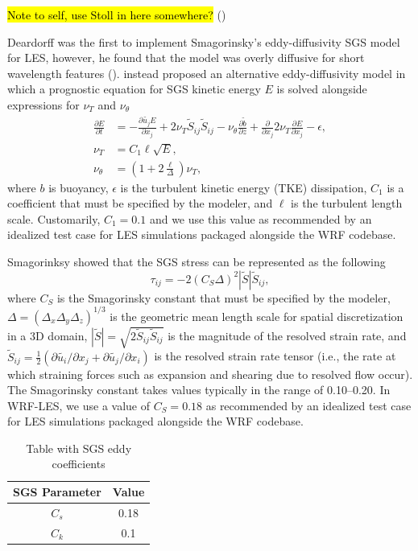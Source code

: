 \hl{Note to self, use Stoll in here somewhere?}
(\cite{stoll_large-eddy_2020})

Deardorff was the first to implement Smagorinsky's eddy-diffusivity SGS model for LES, however, he found that the model was overly diffusive for short wavelength features (\cite{deardorff_numerical_1970}). \cite{deardorff_stratocumulus-capped_1980} instead proposed an alternative eddy-diffusivity model in which a prognostic equation for SGS kinetic energy $E$ is solved alongside expressions for $\nu_T$ and $\nu_{\theta}$
\begin{align}
\frac{\partial E}{\partial t}  &= -\frac{\partial\tilde{u_j}E}{\partial x_j} + 2\nu_T\tilde{S}_{ij}\tilde{S}_{ij} - \nu_{\theta}\frac{\partial \tilde{b}}{\partial z} + \frac{\partial}{\partial x_j}2\nu_T\frac{\partial E}{\partial x_j} - \epsilon, \\
\nu_T &= C_1\ell\sqrt{E}, \\ 
\nu_{\theta} &= \left(1 + 2 \frac{\ell}{\Delta}\right)\nu_T,
\end{align}
where $b$ is buoyancy, $\epsilon$ is the turbulent kinetic energy (TKE) dissipation, $C_1$ is a coefficient that must be specified by the modeler, and $\ell$ is the turbulent length scale. Customarily, $C_1 = 0.1$ and we use this value as recommended by an idealized test case for LES simulations packaged alongside the WRF codebase.

\iffalse

Smagorinksy showed that the SGS stress can be represented as the following 
\begin{equation}
	\tau_{ij} = -2\left(C_S\Delta\right)^2 |\tilde{S}| \tilde{S}_{ij},
\label{equation:smagorinsky_sgs_stress}
\end{equation}
where $C_S$ is the Smagorinsky constant that must be specified by the modeler, $\Delta = (\Delta_x \Delta_y \Delta_z)^{1/3}$ is the geometric mean length scale for spatial discretization in a 3D domain, $|\tilde{S}| =\sqrt{2\tilde{S}_{ij}\tilde{S}_{ij}}$ is the magnitude of the resolved strain rate, and $\tilde{S}_{ij} = \frac{1}{2} (\partial\tilde{u_i}/\partial x_j + \partial\tilde{u_j}/\partial x_i )$ is the resolved strain rate tensor (i.e., the rate at which straining forces such as expansion and shearing due to resolved flow occur). The Smagorinsky constant takes values typically in the range of 0.10--0.20. In WRF-LES, we use a value of $C_S = 0.18$ as recommended by an idealized test case for LES simulations packaged alongside the WRF codebase.
\begin{table}[h!]
\centering
\begin{tabular}{||c c||} 
 \hline
 SGS Parameter & Value\\ [0.5ex] 
 \hline\hline
 $C_s$ & 0.18 \\ 
 $C_k$ & 0.1 \\ [1ex] 
 \hline
\end{tabular}
\caption{Table with SGS eddy coefficients}
\label{table:1}
\end{table}

